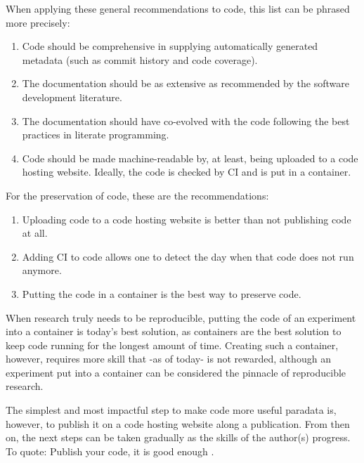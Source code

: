When applying these general recommendations to code, 
this list can be phrased more precisely:

\begin{enumerate}
  \item Code should be comprehensive 
    in supplying automatically generated metadata (such as commit history and code coverage).
  \item The documentation should be as extensive as recommended by the 
    software development literature.
  \item The documentation should have co-evolved with the
    code following the best practices in literate programming. 
  \item Code should be made machine-readable by, at least,
    being uploaded to a code hosting website.
    Ideally, the code is checked by CI and is put in a container.
\end{enumerate}

For the preservation of code, these are the recommendations:

\begin{enumerate}
  \item Uploading code to a code hosting website is better than
    not publishing code at all.
  \item Adding CI to code allows one to detect the day when that code 
    does not run anymore.
  \item Putting the code in a container is the best way to preserve code.
\end{enumerate}


When research truly needs to be reproducible, putting the code 
of an experiment into a container is today's best solution,
as containers are the best solution to keep code running for the longest 
amount of time.
Creating such a container, however, requires more skill
that -as of today- is not rewarded,
although an experiment put into a container 
can be considered the pinnacle of reproducible research.


The simplest and most impactful step to make code more useful paradata
is, however, to publish it on a code hosting website 
along a publication. From then on, the next steps can be taken 
gradually as the skills of the author(s) progress.
To quote: Publish your code, it is good enough \cite{barnes2010publish}.

